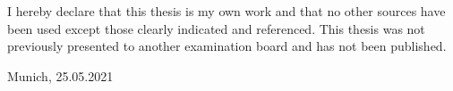 \vspace*{150mm}

I hereby declare that this thesis is my own work and that no other sources have been used
except those clearly indicated and referenced. This thesis was not previously presented
to another examination board and has not been published.
\bigskip

Munich, 25.05.2021